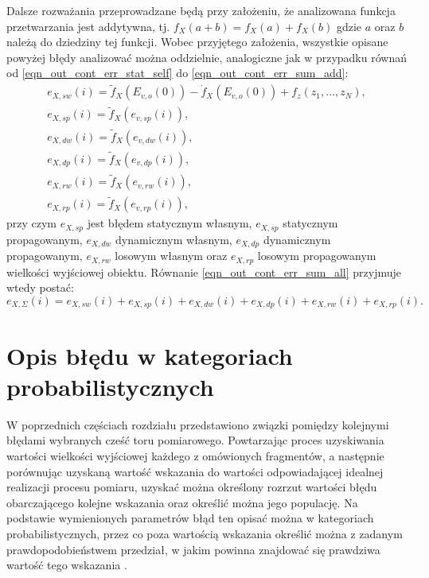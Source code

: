 Dalsze rozważania przeprowadzane będą przy założeniu, że analizowana funkcja przetwarzania jest addytywna, tj. $f_{X}(a + b) = f_{X}(a) + f_{X}(b)$ gdzie $a$ oraz $b$ należą do dziedziny tej funkcji. Wobec przyjętego założenia, wszystkie opisane powyżej błędy analizować można oddzielnie, analogiczne jak w przypadku równań od \eqref{eqn_out_cont_err_stat_self} do \eqref{eqn_out_cont_err_sum_add}:
\begin{gather}
e_{X,sw}(i) = \tilde{f}_{X} \left( E_{v,o}(0) \right) - \dot{f}_{X} \left( E_{v,o}(0) \right) + f_{z}(z_{1}, \hdots, z_{N}) \label{eqn_out_disc_err_stat_self}, \\
e_{X,sp}(i) = \tilde{f}_{X} \left( e_{v,sp}(i) \right) \label{eqn_out_disc_err_stat_prop}, \\
e_{X,dw}(i) = \tilde{f}_{X} \left( e_{v,dw}(i) \right) \label{eqn_out_disc_err_dyn_prop}, \\
e_{X,dp}(i) = \tilde{f}_{X} \left( e_{v,dp}(i) \right) \label{eqn_out_disc_err_dyn_self}, \\
e_{X,rw}(i) = \tilde{f}_{X} \left( e_{v,rw}(i) \right) \label{eqn_out_disc_err_rand_self}, \\
e_{X,rp}(i) = \tilde{f}_{X} \left( e_{v,rp}(i) \right) \label{eqn_out_disc_err_rand_prop},
\end{gather}
przy czym $e_{X,sp}$ jest błędem statycznym własnym, $e_{X,sp}$ statycznym propagowanym, $e_{X,dw}$ dynamicznym własnym, $e_{X,dp}$ dynamicznym propagowanym, $e_{X,rw}$ losowym własnym oraz $e_{X,rp}$ losowym propagowanym wielkości wyjściowej obiektu. Równanie \eqref{eqn_out_cont_err_sum_all} przyjmuje wtedy postać:
\begin{equation}
e_{X,\Sigma}(i) = e_{X,sw}(i) + e_{X,sp}(i) + e_{X,dw}(i) + e_{X,dp}(i) + e_{X,rw}(i) + e_{X,rp}(i) \label{eqn_out_disc_err_sum_add}.
\end{equation}

\section{Opis błędu w kategoriach probabilistycznych}

W poprzednich częściach rozdziału przedstawiono związki pomiędzy kolejnymi błędami wybranych cześć toru pomiarowego. Powtarzając proces uzyskiwania wartości wielkości wyjściowej każdego z omówionych fragmentów, a następnie porównując uzyskaną wartość wskazania do wartości odpowiadającej idealnej realizacji procesu pomiaru, uzyskać można określony rozrzut wartości błędu obarczającego kolejne wskazania oraz określić można jego populację. Na podstawie wymienionych parametrów błąd ten opisać można w kategoriach probabilistycznych, przez co poza wartością wskazania określić można z zadanym prawdopodobieństwem przedział, w jakim powinna znajdować się prawdziwa wartość tego wskazania \cite{jcgm_guide}.


